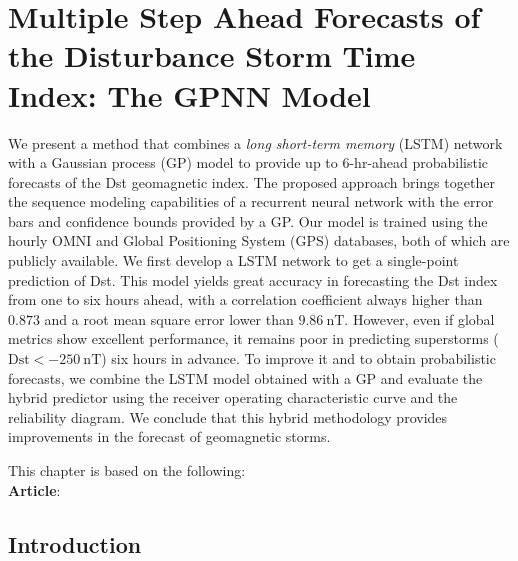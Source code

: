 \chapter{Multiple Step Ahead Forecasts of the Disturbance Storm Time Index: The GPNN Model}\label{chapter:dst_msa}

{\small
	We present a method that combines a \emph{long short-term memory} (LSTM) network with a 
	Gaussian process (GP) model to provide up to 6-hr-ahead probabilistic forecasts of the Dst geomagnetic index. 
	The proposed approach brings together the sequence modeling capabilities of a recurrent neural network with 
	the error bars and confidence bounds provided by a GP. Our model is trained using the hourly OMNI and 
	Global Positioning System (GPS) databases, both of which are publicly available. We first develop a LSTM network 
	to get a single-point prediction of Dst. This model yields great accuracy in forecasting the Dst index from 
	one to six hours ahead, with a correlation coefficient always higher than $0.873$ and a root mean square error 
	lower than $\SI{9.86}{\nano\tesla}$. However, even if global metrics show excellent performance, it remains 
	poor in predicting superstorms ($\mathrm{Dst} < \SI{-250}{\nano\tesla}$) six hours in advance. To improve it 
	and to obtain probabilistic forecasts, we combine the LSTM model obtained with a GP and evaluate the hybrid 
	predictor using the receiver operating characteristic curve and the reliability diagram. We conclude that 
	this hybrid methodology provides improvements in the forecast of geomagnetic storms.

}
	

\vfill
{}
\vfill

\noindent
	\parbox{\textwidth}{%
		{\small This chapter is based on the following:\\

		\textbf{Article}:\\
		}
    }%

\clearpage

\section{Introduction}

